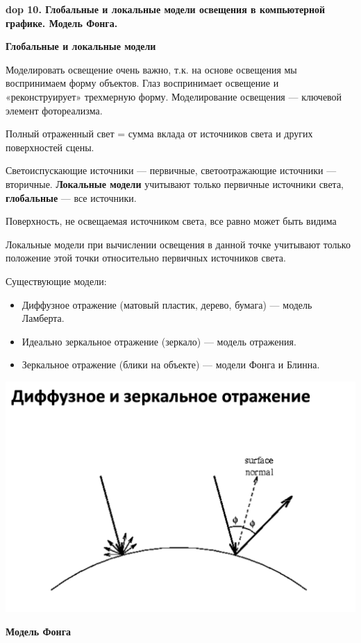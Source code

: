 \textbf{\LARGE dop 10. Глобальные и локальные модели освещения в компьютерной графике. Модель Фонга.}

\textbf{Глобальные и локальные модели}

Моделировать освещение очень важно, т.к. на основе освещения мы воспринимаем форму объектов. Глаз воспринимает освещение и «реконструирует» трехмерную форму. Моделирование освещения --- ключевой элемент фотореализма.

Полный отраженный свет = сумма вклада от источников света и других поверхностей сцены.

Светоиспускающие источники --- первичные, светоотражающие источники --- вторичные. 
\textbf{Локальные модели} учитывают только первичные источники
света, \textbf{глобальные} --- все источники. 

Поверхность, не освещаемая источником света, все равно может быть видима

Локальные модели при вычислении освещения в данной точке учитывают только положение этой точки относительно первичных источников света.

Существующие модели:
\begin{itemize}
    \item Диффузное отражение (матовый пластик, дерево, бумага) --- модель Ламберта. 
    \item Идеально зеркальное отражение (зеркало) --- модель отражения.
    \item Зеркальное отражение (блики на объекте) --- модели Фонга и Блинна.
\end{itemize}

\includegraphics[width=\columnwidth]{pics/reflection.png}

\textbf{Модель Фонга}

